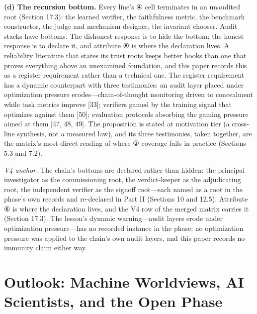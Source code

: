 \documentclass[11pt]{article}
\begin{document}
\noindent \textbf{(d) The recursion bottom.} Every line's ④ cell terminates in an unaudited root (Section 17.3): the learned verifier, the faithfulness metric, the benchmark constructor, the judge and mechanism designer, the invariant chooser. Audit stacks have bottoms. The dishonest response is to hide the bottom; the honest response is to declare it, and attribute ⑥ is where the declaration lives. A reliability literature that states its trust roots keeps better books than one that proves everything above an unexamined foundation, and this paper records this as a register requirement rather than a technical one. The register requirement has a dynamic counterpart with three testimonies: an audit layer placed under optimization pressure erodes—chain-of-thought monitoring driven to concealment while task metrics improve [33]; verifiers gamed by the training signal that optimizes against them [50]; evaluation protocols absorbing the gaming pressure aimed at them [47, 48, 49]. The proposition is stated at motivation tier (a cross-line synthesis, not a measured law), and its three testimonies, taken together, are the matrix's most direct reading of where ② coverage fails in practice (Sections 5.3 and 7.2).\par
\noindent \emph{V4 anchor.} The chain's bottoms are declared rather than hidden: the principal investigator as the commissioning root, the verdict-keeper as the adjudicating root, the independent verifier as the signoff root—each named as a root in the phase's own records and re-declared in Part II (Sections 10 and 12.5). Attribute ⑥ is where the declaration lives, and the V4 row of the merged matrix carries it (Section 17.3). The lesson's dynamic warning—audit layers erode under optimization pressure—has no recorded instance in the phase: no optimization pressure was applied to the chain's own audit layers, and this paper records no immunity claim either way.\par
\section{Outlook: Machine Worldviews, AI Scientists, and the Open Phase}
\label{sec:20}
\end{document}
